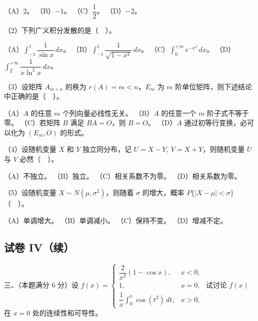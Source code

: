 \documentclass[UTF8,12pt]{ctexart}
\begin{document}
（A）2。 （B）\(\displaystyle -1\)。 （C）\(\displaystyle \dfrac{\displaystyle 1}{\displaystyle 2}\)。 （D）\(\displaystyle -2\)。


（2）下列广义积分发散的是（　）。


（A）\(\displaystyle \int_{-1}^1\dfrac{\displaystyle 1}{\displaystyle \sin x}\,dx\)。 （B）\(\displaystyle \int_{-1}^1\dfrac{\displaystyle 1}{\displaystyle \sqrt{1-x^2}}\,dx\)。 （C）\(\displaystyle \int_0^{+\infty}e^{-x^2}\,dx\)。 （D）\(\displaystyle \int_2^{+\infty}\dfrac{\displaystyle 1}{\displaystyle x\ln^2x}\,dx\)。


（3）设矩阵 \(\displaystyle A_{m\times n}\) 的秩为 \(\displaystyle r(A)=m<n\)，\(\displaystyle E_m\) 为 \(\displaystyle m\) 阶单位矩阵，则下述结论中正确的是（　）。


（A）\(\displaystyle A\) 的任意 \(\displaystyle m\) 个列向量必线性无关。 （B）\(\displaystyle A\) 的任意一个 \(\displaystyle m\) 阶子式不等于零。 （C）若矩阵 \(\displaystyle B\) 满足 \(\displaystyle BA=O\)，则 \(\displaystyle B=O\)。 （D）\(\displaystyle A\) 通过初等行变换，必可以化为 \(\displaystyle (E_m,\allowbreak O)\) 的形式。


（4）设随机变量 \(\displaystyle X\) 和 \(\displaystyle Y\) 独立同分布，记 \(\displaystyle U=X-Y,\allowbreak \ V=X+Y\)，则随机变量 \(\displaystyle U\) 与 \(\displaystyle V\) 必然（　）。


（A）不独立。 （B）独立。 （C）相关系数不为零。 （D）相关系数为零。


（5）设随机变量 \(\displaystyle X\sim N(\mu,\allowbreak \sigma^2)\)，则随着 \(\displaystyle \sigma\) 的增大，概率 \(\displaystyle P\{|X-\mu|<\sigma\}\)（　）。


（A）单调增大。 （B）单调减小。 （C）保持不变。 （D）增减不定。


\subsection*{试卷 IV（续）}

三、（本题满分 6 分）设 \(\displaystyle f(x)=\begin{cases}\dfrac{\displaystyle 2}{\displaystyle x^2}(1-\cos x),\allowbreak &x<0,\allowbreak \\1,\allowbreak &x=0,\allowbreak \\\dfrac{\displaystyle 1}{\displaystyle x}\displaystyle \int_0^x\cos(t^2)\,dt,\allowbreak &x>0,\allowbreak \end{cases}\) 试讨论 \(\displaystyle f(x)\) 在 \(\displaystyle x=0\) 处的连续性和可导性。
\end{document}
